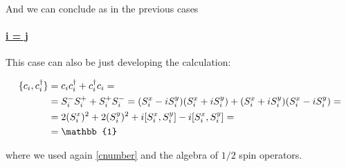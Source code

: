 \noindent And we can conclude as in the previous cases

\paragraph{\underline{i = j}} This case can also be just developing the calculation:

\begin{align*}
\{c_i, c_i^\dagger\} &= c_i c_i^\dagger + c_i^\dagger c_i =\\
&= S_i^- S_i^+ + S_i^+ S_i^- = (S_i^x - iS_i^y)(S_i^x + iS_i^y) + (S_i^x + iS_i^y)(S_i^x - iS_i^y) =\\
&= 2(S_i^x)^2 + 2(S_i^y)^2 + i\comm{S_i^x}{S_i^y} - i\comm{S_i^x}{S_i^y} =\\
&= \mathbb{1}
\end{align*}

\noindent where we used again \cref{cnumber} and the algebra of $1/2$ spin operators.
